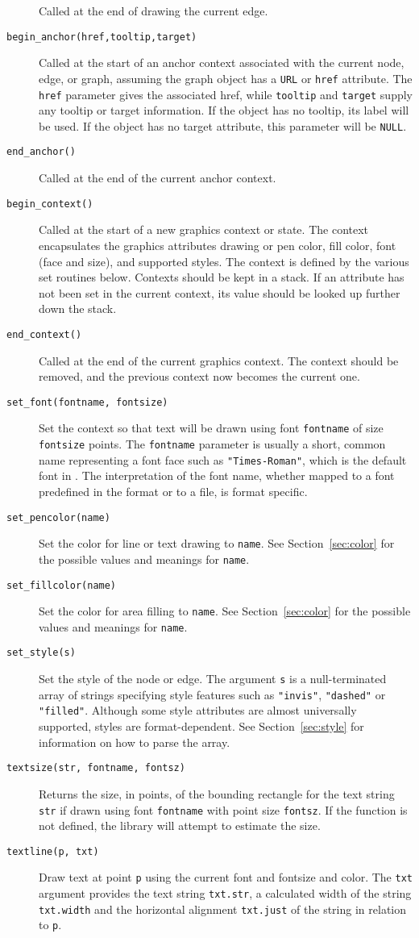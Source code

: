 \begin{description}
Called at the end of drawing the current edge.
\item[{\tt begin\_anchor(href,tooltip,target)}]
Called at the start of an anchor context associated
with the current node, edge, or graph, assuming the graph
object has a {\tt URL} or {\tt href} attribute. The
{\tt href} parameter gives the associated href, while
{\tt tooltip} and {\tt target} supply any tooltip or target information.
If the object has no tooltip, its label will be used. 
If the object has no target attribute, this parameter will be {\tt NULL}.
\item[{\tt end\_anchor()}]
Called at the end of the current anchor context.
\item[{\tt begin\_context()}]
Called at the start of a new graphics context or state. The context
encapsulates the graphics attributes drawing or pen color, fill color,
font (face and size), and supported styles. The context is defined
by the various set routines below. Contexts should be kept in a stack.
If an attribute has not been set in the current context, its value
should be looked up further down the stack.
\item[{\tt end\_context()}]
Called at the end of the current graphics context. The context should be
removed, and the previous context now becomes the current one.
\item[{\tt set\_font(fontname, fontsize)}]
Set the context so that text will be drawn using font {\tt fontname}
of size {\tt fontsize} points. The {\tt fontname} parameter is usually
a short, common name representing a font face such as {\tt "Times-Roman"},
which is the default font in \gviz. The interpretation of the font name,
whether mapped to a font predefined in the format or to a file,
is format specific.
\item[{\tt set\_pencolor(name)}]
Set the color for line or text drawing to {\tt name}.
See Section~\ref{sec:color} for the possible values and meanings 
for {\tt name}.
\item[{\tt set\_fillcolor(name)}]
Set the color for area filling to {\tt name}.
See Section~\ref{sec:color} for the possible values and meanings 
for {\tt name}.
\item[{\tt set\_style(s)}]
Set the style of the node or edge. The argument {\tt s} is a
null-terminated array of
strings specifying style features such as {\tt "invis"}, {\tt "dashed"}
or {\tt "filled"}.
Although some style attributes are almost universally supported,
styles are format-dependent.
See Section~\ref{sec:style} for information on how to parse the array.
\item[{\tt textsize(str, fontname, fontsz)}]
Returns the size, in points,
of the bounding rectangle for the text string {\tt str} if
drawn using font {\tt fontname} with point size {\tt fontsz}.
If the function is not defined, the library will attempt to
estimate the size.
\item[{\tt textline(p, txt)}]
Draw text at point {\tt p} using the current font and fontsize and color. 
The {\tt txt} argument provides the text string {\tt txt.str},
a calculated width of the string {\tt txt.width} and 
the horizontal alignment {\tt txt.just} of the string in relation to {\tt p}.


\end{description}
